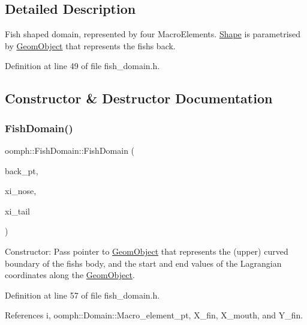 \subsection{Detailed Description}
Fish shaped domain, represented by four Macro\+Elements. \hyperlink{classoomph_1_1Shape}{Shape} is parametrised by \hyperlink{classoomph_1_1GeomObject}{Geom\+Object} that represents the fish\textquotesingle{}s back. 

Definition at line 49 of file fish\+\_\+domain.\+h.



\subsection{Constructor \& Destructor Documentation}
\mbox{\label{classoomph_1_1FishDomain_a96f1e192900962ee55d063577822cd12}} 
\subsubsection{\texorpdfstring{Fish\+Domain()}{FishDomain()}\hspace{0.1cm}{\footnotesize\ttfamily [1/2]}}
{\footnotesize\ttfamily oomph\+::\+Fish\+Domain\+::\+Fish\+Domain (\begin{DoxyParamCaption}\item[{\hyperlink{classoomph_1_1GeomObject}{Geom\+Object} $\ast$}]{back\+\_\+pt,  }\item[{const double \&}]{xi\+\_\+nose,  }\item[{const double \&}]{xi\+\_\+tail }\end{DoxyParamCaption})\hspace{0.3cm}{\ttfamily [inline]}}



Constructor\+: Pass pointer to \hyperlink{classoomph_1_1GeomObject}{Geom\+Object} that represents the (upper) curved boundary of the fish\textquotesingle{}s body, and the start and end values of the Lagrangian coordinates along the \hyperlink{classoomph_1_1GeomObject}{Geom\+Object}. 



Definition at line 57 of file fish\+\_\+domain.\+h.



References i, oomph\+::\+Domain\+::\+Macro\+\_\+element\+\_\+pt, X\+\_\+fin, X\+\_\+mouth, and Y\+\_\+fin.

